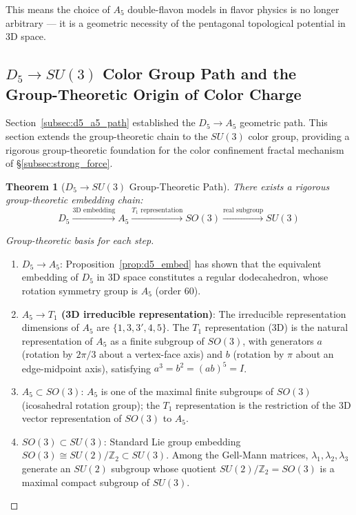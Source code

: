 \documentclass[12pt,a4paper,twocolumn]{article}
\newtheorem{theorem}{Theorem}[section]
\begin{document}
This means the choice of $A_5$ double-flavon models in flavor physics is no longer arbitrary --- it is a geometric necessity of the pentagonal topological potential in 3D space.

\subsection{$D_5 \to SU(3)$ Color Group Path and the Group-Theoretic Origin of Color Charge}
\label{subsec:d5_su3}

Section~\ref{subsec:d5_a5_path} established the $D_5 \to A_5$ geometric path. This section extends the group-theoretic chain to the $SU(3)$ color group, providing a rigorous group-theoretic foundation for the color confinement fractal mechanism of \S\ref{subsec:strong_force}.

\begin{theorem}[$D_5 \to SU(3)$ Group-Theoretic Path]
\label{thm:d5_su3}
There exists a rigorous group-theoretic embedding chain:
\begin{equation}
D_5 \xrightarrow{\text{3D embedding}} A_5 \xrightarrow{T_1\text{ representation}} SO(3) \xrightarrow{\text{real subgroup}} SU(3)
\end{equation}
\end{theorem}

\begin{proof}[Group-theoretic basis for each step]
\begin{enumerate}
\item \textbf{$D_5 \to A_5$}: Proposition~\ref{prop:d5_embed} has shown that the equivalent embedding of $D_5$ in 3D space constitutes a regular dodecahedron, whose rotation symmetry group is $A_5$ (order 60).
\item \textbf{$A_5 \to T_1$ (3D irreducible representation)}: The irreducible representation dimensions of $A_5$ are $\{1, 3, 3', 4, 5\}$. The $T_1$ representation (3D) is the natural representation of $A_5$ as a finite subgroup of $SO(3)$, with generators $a$ (rotation by $2\pi/3$ about a vertex-face axis) and $b$ (rotation by $\pi$ about an edge-midpoint axis), satisfying $a^3 = b^2 = (ab)^5 = I$.
\item \textbf{$A_5 \subset SO(3)$}: $A_5$ is one of the maximal finite subgroups of $SO(3)$ (icosahedral rotation group); the $T_1$ representation is the restriction of the 3D vector representation of $SO(3)$ to $A_5$.
\item \textbf{$SO(3) \subset SU(3)$}: Standard Lie group embedding $SO(3) \cong SU(2)/\mathbb{Z}_2 \subset SU(3)$. Among the Gell-Mann matrices, $\lambda_1, \lambda_2, \lambda_3$ generate an $SU(2)$ subgroup whose quotient $SU(2)/\mathbb{Z}_2 = SO(3)$ is a maximal compact subgroup of $SU(3)$.
\end{enumerate}
\end{proof}
\end{document}
